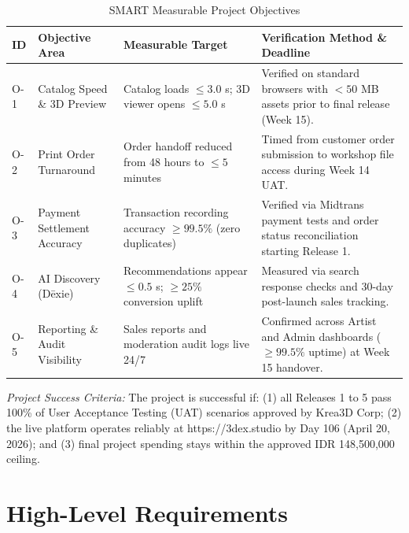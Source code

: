 \documentclass[11pt,a4paper]{article}
\newcommand{\thdr}[1]{\centering\arraybackslash\textbf{#1}}
\renewcommand{\arraystretch}{1.26}
\begin{document}
\begin{table}[H]
\centering
{\renewcommand{\arraystretch}{1.15}\small
\caption{SMART Measurable Project Objectives}
\begin{tabularx}{\textwidth}{| C{1.0cm} | L{3.3cm} | L{3.6cm} | Y |}
\hline
{} \thdr{ID} & \thdr{Objective Area} & \thdr{Measurable Target} & \thdr{Verification Method \& Deadline} \\
\hline
O-1 & Catalog Speed \& 3D Preview & Catalog loads $\le 3.0$ s; 3D viewer opens $\le 5.0$ s & Verified on standard browsers with $< 50$ MB assets prior to final release (Week 15). \\
\hline
O-2 & Print Order Turnaround & Order handoff reduced from 48 hours to $\le 5$ minutes & Timed from customer order submission to workshop file access during Week 14 UAT. \\
\hline
O-3 & Payment Settlement Accuracy & Transaction recording accuracy $\ge 99.5\%$ (zero duplicates) & Verified via Midtrans payment tests and order status reconciliation starting Release 1. \\
\hline
O-4 & AI Discovery (D\={e}xie) & Recommendations appear $\le 0.5$ s; $\ge 25\%$ conversion uplift & Measured via search response checks and 30-day post-launch sales tracking. \\
\hline
O-5 & Reporting \& Audit Visibility & Sales reports and moderation audit logs live 24/7 & Confirmed across Artist and Admin dashboards ($\ge 99.5\%$ uptime) at Week 15 handover. \\
\hline
\end{tabularx}}
\end{table}

\textit{Project Success Criteria:}
The project is successful if: (1) all Releases 1 to 5 pass 100\% of User Acceptance Testing (UAT) scenarios approved by Krea3D Corp; (2) the live platform operates reliably at https://3dex.studio by Day 106 (April 20, 2026); and (3) final project spending stays within the approved IDR 148,500,000 ceiling.

\clearpage

\section{High-Level Requirements}
\end{document}
